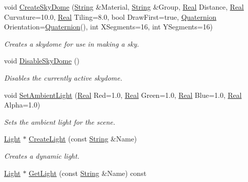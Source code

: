 \begin{DoxyCompactItemize}
void \hyperlink{classphys_1_1SceneManager_abdcafee65bedf3c268759553b91a7c6b}{CreateSkyDome} (\hyperlink{namespacephys_aa03900411993de7fbfec4789bc1d392e}{String} \&Material, \hyperlink{namespacephys_aa03900411993de7fbfec4789bc1d392e}{String} \&Group, \hyperlink{namespacephys_af7eb897198d265b8e868f45240230d5f}{Real} Distance, \hyperlink{namespacephys_af7eb897198d265b8e868f45240230d5f}{Real} Curvature=10.0, \hyperlink{namespacephys_af7eb897198d265b8e868f45240230d5f}{Real} Tiling=8.0, bool DrawFirst=true, \hyperlink{classphys_1_1Quaternion}{Quaternion} Orientation=\hyperlink{classphys_1_1Quaternion}{Quaternion}(), int XSegments=16, int YSegments=16)
\begin{DoxyCompactList}\small\item\em Creates a skydome for use in making a sky. \item\end{DoxyCompactList}\item 
void \hyperlink{classphys_1_1SceneManager_a11bf15ca8c7d758ee50e423ad03d2625}{DisableSkyDome} ()
\begin{DoxyCompactList}\small\item\em Disables the currently active skydome. \item\end{DoxyCompactList}\item 
void \hyperlink{classphys_1_1SceneManager_a686b7199aff8db87af84f40ec933809a}{SetAmbientLight} (\hyperlink{namespacephys_af7eb897198d265b8e868f45240230d5f}{Real} Red=1.0, \hyperlink{namespacephys_af7eb897198d265b8e868f45240230d5f}{Real} Green=1.0, \hyperlink{namespacephys_af7eb897198d265b8e868f45240230d5f}{Real} Blue=1.0, \hyperlink{namespacephys_af7eb897198d265b8e868f45240230d5f}{Real} Alpha=1.0)
\begin{DoxyCompactList}\small\item\em Sets the ambient light for the scene. \item\end{DoxyCompactList}\item 
\hyperlink{classphys_1_1Light}{Light} $\ast$ \hyperlink{classphys_1_1SceneManager_aaf14df62a5d6c55c3307d154a0caf5ea}{CreateLight} (const \hyperlink{namespacephys_aa03900411993de7fbfec4789bc1d392e}{String} \&Name)
\begin{DoxyCompactList}\small\item\em Creates a dynamic light. \item\end{DoxyCompactList}\item 
\hyperlink{classphys_1_1Light}{Light} $\ast$ \hyperlink{classphys_1_1SceneManager_a00849466a4248d71f7e1ecfd5a07a89c}{GetLight} (const \hyperlink{namespacephys_aa03900411993de7fbfec4789bc1d392e}{String} \&Name) const 

\end{DoxyCompactItemize}
